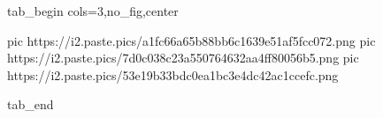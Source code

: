  
 
 
 
 


\ifcmt
	tab_begin cols=3,no_fig,center

		 pic https://i2.paste.pics/a1fc66a65b88bb6c1639e51af5fcc072.png
		 pic https://i2.paste.pics/7d0c038c23a550764632aa4ff80056b5.png
		 pic https://i2.paste.pics/53e19b33bdc0ea1bc3e4dc42ac1ccefc.png

	tab_end
\fi
